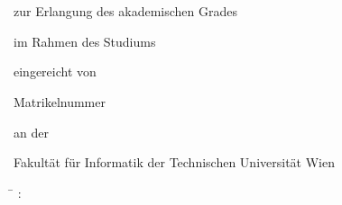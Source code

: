\begin{center}
{\ \vspace{3.4cm}}

\begin{minipage}[t][2.8cm][s]{\textwidth}%
\centering
\thesistitlefontHUGE\sffamily\bfseries\tuinfthesistitle\\
\bigskip
{\thesistitlefonthuge\sffamily\bfseries\tuinfthesissubtitle}
\end{minipage}

\vspace{1.3cm}

{\thesistitlefontLARGE\sffamily \tuinfthesistype}

\vspace{6mm}

{\thesistitlefontlarge\sffamily zur Erlangung des akademischen Grades}

\vspace{6mm}

{\thesistitlefontLARGE\sffamily\bfseries \tuinfthesisdegree}

\vspace{6mm}

{\thesistitlefontlarge\sffamily im Rahmen des Studiums}

\vspace{6mm}

{\thesistitlefontLarge\sffamily\bfseries \tuinfthesiscurriculum}

\vspace{6.5mm}

{\thesistitlefontlarge\sffamily eingereicht von}

\vspace{6mm}

{\thesistitlefontLarge\sffamily\bfseries \tuinfthesisauthor}

\vspace{1.5mm}

{\thesistitlefontlarge\sffamily Matrikelnummer \tuinfthesismatrikelno} 

\vspace{1.4cm}

\vspace{0pt}\raggedright\thesistitlefontnormalsize\sffamily
\begin{minipage}[t][1.6cm][t]{\textwidth}%
  an der

  Fakult\"{a}t f\"{u}r Informatik der Technischen Universit\"{a}t Wien
\end{minipage}

\begin{minipage}[t][2.5cm][t]{\textwidth}%
  \vspace{0pt}\raggedright\thesistitlefontnormalsize\sffamily
  \begin{tabbing}%
	    \hspace{19mm} \= \hspace{66mm} \kill
	    \tuinfthesisbetreuung: \> \tuinfthesisbetreins\\
  \end{tabbing}
\end{minipage}


\end{center}
